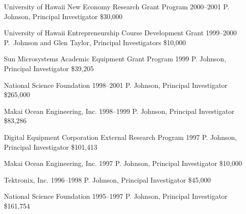\documentclass[11pt,letterpaper,sans]{moderncv} %
\begin{document}
        {University of Hawaii New Economy Research Grant Program} %
        {2000--2001} %
        {P. Johnson, Principal Investigator}  %
        {\$30,000} %

        {University of Hawaii Entrepreneurship Course Development Grant} %
        {1999--2000} %
        {P.~Johnson and Glen Taylor, Principal Investigators}  %
        {\$10,000} %

        {Sun Microsystems Academic Equipment Grant Program} %
        {1999} %
        {P. Johnson, Principal Investigator}  %
        {\$39,205} %

        {National Science Foundation} %
        {1998--2001} %
        {P. Johnson, Principal Investigator}  %
        {\$265,000} %

        {Makai Ocean Engineering, Inc.} %
        {1998--1999} %
        {P. Johnson, Principal Investigator}  %
        {\$83,286} %

        {Digital Equipment Corporation External Research Program} %
        {1997} %
        {P. Johnson, Principal Investigator}  %
        {\$101,413} %

        {Makai Ocean Engineering, Inc.} %
        {1997} %
        {P. Johnson, Principal Investigator}  %
        {\$10,000} %

        {Tektronix, Inc.} %
        {1996--1998} %
        {P. Johnson, Principal Investigator}  %
        {\$45,000} %

        {National Science Foundation} %
        {1995--1997} %
        {P. Johnson, Principal Investigator}  %
        {\$161,754} %
\end{document}
